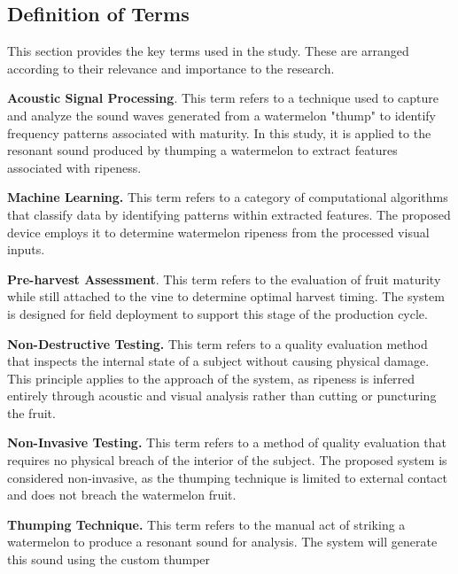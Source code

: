 \begin{thesisprose}
\section{Definition of Terms}

This section provides the key terms used in the study. These are arranged according to their relevance and importance to the research.

\textbf{Acoustic Signal Processing}. This term refers to a technique used to capture and analyze the sound waves generated from a watermelon "thump" to identify frequency patterns associated with maturity. In this study, it is applied to the resonant sound produced by thumping a watermelon to extract features associated with ripeness.

\textbf{Machine Learning.} This term refers to a category of computational algorithms that classify data by identifying patterns within extracted features. The proposed device employs it to determine watermelon ripeness from the processed visual inputs.

\textbf{Pre-harvest Assessment}. This term refers to the evaluation of fruit maturity while still attached to the vine to determine optimal harvest timing. The system is designed for field deployment to support this stage of the production cycle.

\textbf{Non-Destructive Testing.} This term refers to a quality evaluation method that inspects the internal state of a subject without causing physical damage. This principle applies to the approach of the system, as ripeness is inferred entirely through acoustic and visual analysis rather than cutting or puncturing the fruit.

\textbf{Non-Invasive Testing.} This term refers to a method of quality evaluation that requires no physical breach of the interior of the subject. The proposed system is considered non-invasive, as the thumping technique is limited to external contact and does not breach the watermelon fruit.

\textbf{Thumping Technique.} This term refers to the manual act of striking a watermelon to produce a resonant sound for analysis. The system will generate this sound using the custom thumper

\end{thesisprose}
